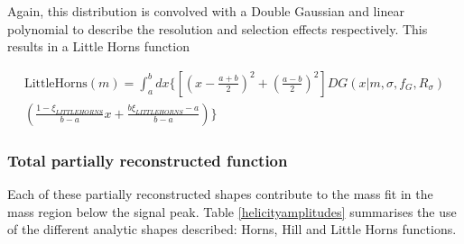 Again, this distribution is convolved with a Double Gaussian and linear polynomial to describe the resolution and selection effects respectively. This results in a Little Horns function

\begin{multline}
\text{LittleHorns}(m) = \int_a^b dx \biggl\{ \left[ \left( x - \frac{a+b}{2} \right) ^2 + \left( \frac{a-b}{2} \right) ^2 \right] DG(x|m,\sigma,f_G,R_{\sigma}) \\
\left( \frac{1 - \xi_{LITTLEHORNS}}{b - a}x + \frac{b\xi_{LITTLEHORNS} - a}{b - a} \right) \biggr\}
\label{eqn:littlehorns}
\end{multline}

\subsubsection{Total partially reconstructed function}

Each of these partially reconstructed shapes contribute to the mass fit in the \Bm mass region below the signal peak. Table \ref{helicityamplitudes} summarises the use of the different analytic shapes described: Horns, Hill and Little Horns functions. 

\begin{table}[h]
\centering
{}
\caption{Different partially reconstructed shapes and \Dstar helicity states and how this relates to the dependence on the helicity angle and the \B mass parameterisation}
\label{helicityamplitudes}
\end{table}

